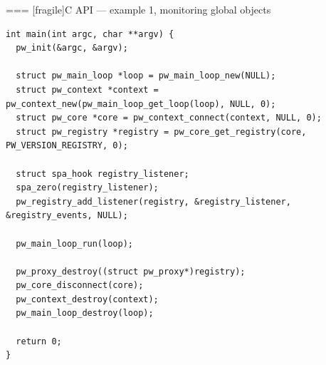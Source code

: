 === [fragile]{C API — example 1, monitoring global objects}
  \begin{block}{}
    \fontsize{8}{8}\selectfont
      \begin{verbatim}
int main(int argc, char **argv) {
  pw_init(&argc, &argv);

  struct pw_main_loop *loop = pw_main_loop_new(NULL);
  struct pw_context *context = pw_context_new(pw_main_loop_get_loop(loop), NULL, 0);
  struct pw_core *core = pw_context_connect(context, NULL, 0);
  struct pw_registry *registry = pw_core_get_registry(core, PW_VERSION_REGISTRY, 0);

  struct spa_hook registry_listener;
  spa_zero(registry_listener);
  pw_registry_add_listener(registry, &registry_listener, &registry_events, NULL);

  pw_main_loop_run(loop);

  pw_proxy_destroy((struct pw_proxy*)registry);
  pw_core_disconnect(core);
  pw_context_destroy(context);
  pw_main_loop_destroy(loop);

  return 0;
}
    \end{verbatim}
  \end{block}




